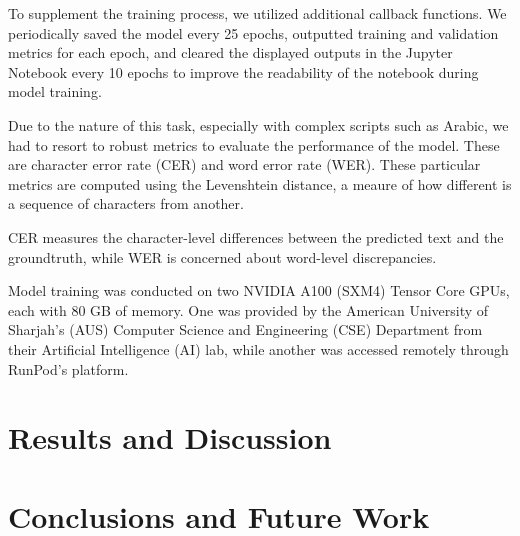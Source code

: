\documentclass[conference]{IEEEtran}
\begin{document}
To supplement the training process, we utilized additional callback functions. We periodically saved the model every 25 epochs, outputted training and validation metrics for each epoch, and cleared the displayed outputs in the Jupyter Notebook every 10 epochs to improve the readability of the notebook during model training.

Due to the nature of this task, especially with complex scripts such as Arabic, we had to resort to robust metrics to evaluate the performance of the model. These are character error rate (CER) and word error rate (WER). These particular metrics are computed using the Levenshtein distance, a meaure of how different is a sequence of characters from another.

CER measures the character-level differences between the predicted text and the groundtruth, while WER is concerned about word-level discrepancies. 

Model training was conducted on two NVIDIA A100 (SXM4) Tensor Core GPUs, each with 80 GB of memory. One was provided by the American University of Sharjah's (AUS) Computer Science and Engineering (CSE) Department from their Artificial Intelligence (AI) lab, while another was accessed remotely through RunPod's platform.













\section{Results and Discussion}

\blindtext[2]

\section{Conclusions and Future Work}

\blindtext[3]




 

\end{document}
